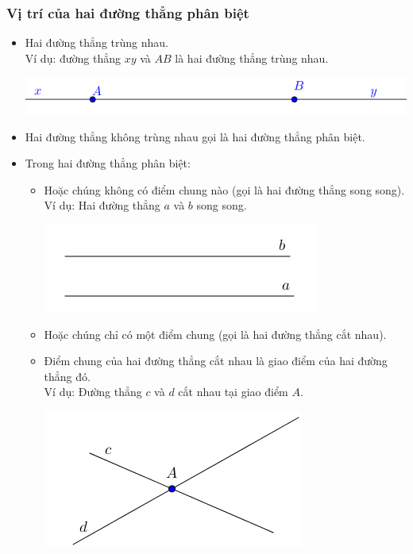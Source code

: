 \begin{tomtat}
	\subsubsection{Vị trí của hai đường thẳng phân biệt}
\begin{itemize}
		\item Hai đường thẳng trùng nhau.\\
		Ví dụ: đường thẳng $xy$ và $AB$ là hai đường thẳng trùng nhau.
			\begin{center}
			\includegraphics[scale=0.7]{img/bai3_vd3a}
			\end{center}		
		\item	Hai đường thẳng không trùng nhau gọi là hai đường thẳng phân biệt.
        \item 	Trong hai đường thẳng phân biệt:
        \begin{itemize}     
			\item Hoặc chúng không có điểm chung nào (gọi là hai đường thẳng song song).\\
			Ví dụ: Hai đường thẳng $a$ và $b$ song song.
			\begin{center}
			\includegraphics[scale=0.7]{img/bai3_vd4}
			\end{center}
			\item Hoặc chúng chỉ có một điểm chung (gọi là hai đường thẳng cắt nhau).
			\item Điểm chung của hai đường thẳng cắt nhau là giao điểm của hai đường thẳng đó.\\
			Ví dụ: Đường thẳng $c$ và $d$ cắt nhau tại giao điểm $A$.
			\begin{center}
			\includegraphics[scale=0.7]{img/bai3_vd5}
			\end{center}
			\end{itemize}
\end{itemize}
\end{tomtat}

